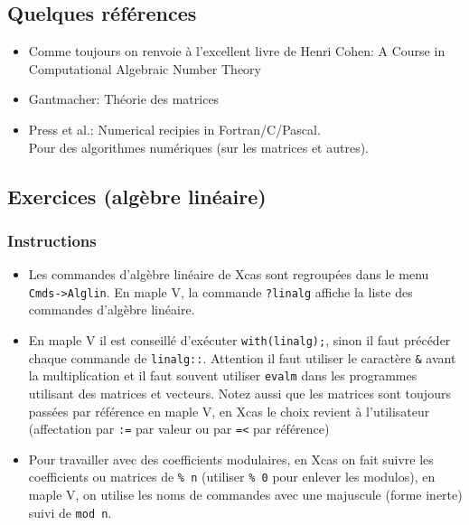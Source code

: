 \documentclass[a4paper,11pt]{article}
\begin{document}
\subsection{Quelques r\'ef\'erences} \label{sec:ref}

\begin{itemize}
\item Comme toujours on renvoie à l'excellent livre de Henri Cohen:
A Course in Computational Algebraic Number Theory

\item Gantmacher: Th\'eorie des matrices


\item Press et al.: Numerical recipies in Fortran/C/Pascal.\\
Pour des algorithmes numériques (sur les matrices et autres).

\end{itemize}


\subsection{Exercices (alg\`ebre lin\'eaire)}
\subsubsection{Instructions}
\begin{itemize}
\item Les commandes d'alg\`ebre lin\'eaire de Xcas sont
regroup\'ees dans le menu {\tt Cmds->Alglin}.
En maple V, la commande {\tt ?linalg} affiche
la liste des commandes d'algèbre linéaire. 
\item En maple V il est conseillé d'exécuter {\tt with(linalg);},
sinon il faut précéder
chaque commande de {\tt linalg::}.
Attention
il faut utiliser le caractère {\tt \&} avant la multiplication
et il faut souvent utiliser {\tt evalm} dans les programmes
utilisant des matrices et vecteurs. Notez aussi que les
matrices sont toujours pass\'ees par r\'ef\'erence en maple V,
en Xcas le choix revient \`a l'utilisateur (affectation par \verb|:=|
par valeur ou par \verb|=<| par r\'ef\'erence)
\item Pour travailler avec des
coefficients modulaires, en Xcas
on fait suivre les coefficients ou matrices de {\tt \% n}
(utiliser \verb|% 0| pour enlever les modulos),
en maple V, on utilise les noms de commandes
avec une majuscule (forme inerte) suivi de {\tt mod n}.
\end{itemize}
\end{document}
